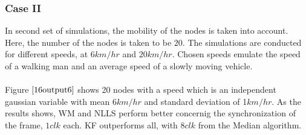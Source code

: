 \documentclass[a4paper,10pt]{report}
\begin{document}
\subsubsection{\textbf{Case II}}
In second set of simulations, the mobility of the nodes is taken into account. Here, the number of the nodes is taken to be $20$. The simulations are conducted for different speeds, at $6km/hr$ and $20km/hr$. Chosen speeds emulate the speed of a walking man and an average speed of a slowly moving vehicle.
\paragraph*{}
Figure $\ref{16output6}$ shows 20 nodes with a speed which is an independent gaussian variable with mean $6km/hr$ and standard deviation of 1$km/hr$. As the results shows, WM and NLLS perform better concernig the synchronization of the frame, $1 clk$ each. KF outperforms all, with $8 clk$ from the Median algorithm.
\end{document}
